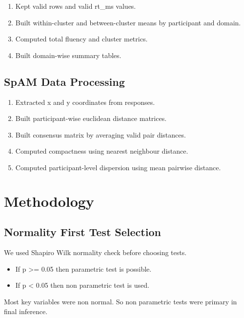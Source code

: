 \begin{enumerate}
\def\labelenumi{\arabic{enumi}.}
\tightlist
\item
  Kept valid rows and valid rt\_ms values.
\item
  Built within-cluster and between-cluster means by participant and
  domain.
\item
  Computed total fluency and cluster metrics.
\item
  Built domain-wise summary tables.
\end{enumerate}

\subsection{SpAM Data Processing}\label{spam-data-processing}

\begin{enumerate}
\def\labelenumi{\arabic{enumi}.}
\tightlist
\item
  Extracted x and y coordinates from responses.
\item
  Built participant-wise euclidean distance matrices.
\item
  Built consensus matrix by averaging valid pair distances.
\item
  Computed compactness using nearest neighbour distance.
\item
  Computed participant-level dispersion using mean pairwise distance.
\end{enumerate}

\section{Methodology}\label{methodology}

\subsection{Normality First Test
Selection}\label{normality-first-test-selection}

We used Shapiro Wilk normality check before choosing tests.

\begin{itemize}
\tightlist
\item
  If p \textgreater= 0.05 then parametric test is possible.
\item
  If p \textless{} 0.05 then non parametric test is used.
\end{itemize}

Most key variables were non normal. So non parametric tests were primary
in final inference.

